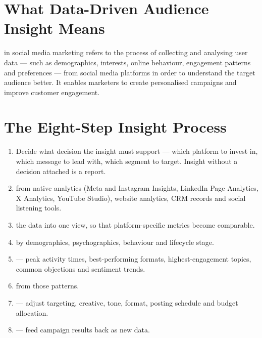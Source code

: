 \documentclass{MMTextbook}
\begin{document}
\section{What Data-Driven Audience Insight Means}

\begin{exambox}
 in social
media marketing refers to the process of collecting and analysing user data ---
such as demographics, interests, online behaviour, engagement patterns and
preferences --- from social media platforms in order to understand the target
audience better. It enables marketers to create personalised campaigns and
improve customer engagement.
\end{exambox}

\section{The Eight-Step Insight Process}

\begin{enumerate}
\item {} Decide what decision the insight must support
      --- which platform to invest in, which message to lead with, which segment
      to target. Insight without a decision attached is a report.
\item {} from native analytics (Meta and Instagram Insights,
      LinkedIn Page Analytics, X Analytics, YouTube Studio), website analytics,
      CRM records and social listening tools.
\item {} the data into one view, so that
      platform-specific metrics become comparable.
\item {} by demographics, psychographics, behaviour and
      lifecycle stage.
\item {} --- peak activity times, best-performing formats,
      highest-engagement topics, common objections and sentiment trends.
\item {} from those patterns.
\item {} --- adjust targeting, creative, tone, format,
      posting schedule and budget allocation.
\item {} --- feed campaign results back as new data.
\end{enumerate}
\end{document}
